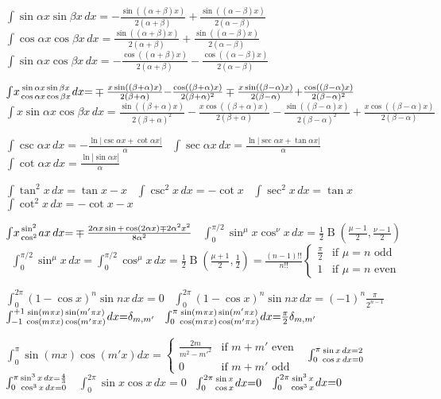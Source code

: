 {$\int\!\sin\alpha x\sin\beta x\,dx{=}{-}\frac{\sin((\alpha{+}\beta)x)}{2(\alpha{+}\beta)}{+}\frac{\sin((\alpha{-}\beta)x)}{2(\alpha{-}\beta)}$ \
$\int\!\cos\alpha x\cos\beta x\,dx{=}\frac{\sin((\alpha{+}\beta)x)}{2(\alpha{+}\beta)}{+}\frac{\sin((\alpha{-}\beta)x)}{2(\alpha{-}\beta)}$ \
$\int\!\sin\alpha x\cos\beta x\,dx{=}{-}\frac{\cos((\alpha{+}\beta)x)}{2(\alpha{+}\beta)}{-}\frac{\cos((\alpha{-}\beta)x)}{2(\alpha{-}\beta)}$

$\int\!x\genfrac{}{}{0pt}{}{\sin\alpha x\sin\beta x}{\cos\alpha x\cos\beta x}dx{=}\mp\frac{x\sin((\beta{+}\alpha)x)}{2(\beta{+}\alpha)}{-}\frac{\cos((\beta{+}\alpha)x)}{2(\beta{+}\alpha)^2}\mp\frac{x\sin((\beta{-}\alpha)x)}{2(\beta{-}\alpha)}{+}\frac{\cos((\beta{-}\alpha)x)}{2(\beta{-}\alpha)^2}$ \
$\int\!x\sin\alpha x\cos\beta x\,dx{=}\frac{\sin((\beta{+}\alpha)x)}{2(\beta{+}\alpha)^2}{-}\frac{x\cos((\beta{+}\alpha)x)}{2(\beta{+}\alpha)}{-}\frac{\sin((\beta{-}\alpha)x)}{2(\beta{-}\alpha)^2}{+}\frac{x\cos((\beta{-}\alpha)x)}{2(\beta{-}\alpha)}$

$\int\!\csc\alpha x\,dx{=}{-}\frac{\ln|\csc\alpha x{+}\cot\alpha x|}{\alpha}$ \
$\int\!\sec\alpha x\,dx{=}\frac{\ln|\sec\alpha x{+}\tan\alpha x|}{\alpha}$ \
$\int\!\cot\alpha x\,dx{=}\frac{\ln|\sin\alpha x|}{\alpha}$

$\int\!\tan^2x\,dx{=}\tan x{-}x$ \
$\int\!\csc^2x\,dx{=}{-}\cot x$ \
$\int\!\sec^2x\,dx{=}\tan x$ \
$\int\!\cot^2x\,dx{=}{-}\cot x{-}x$

$\int\!x\genfrac{}{}{0pt}{}{\sin^2}{\cos^2}ax\,dx{=}\mp\frac{2\alpha x\sin{+}\cos(2\alpha x)\mp2\alpha^2x^2}{8\alpha^2}$ \
$\int_0^{\pi/2}\!\sin^\mu x\cos^\nu x\,dx{=}\frac{1}{2}\operatorname{B}(\frac{\mu-1}{2},\frac{\nu-1}{2})$ \
$\int_0^{\pi/2}\!\sin^\mu x\,dx{=}\int_0^{\pi/2}\!\cos^\mu x\,dx{=}\frac{1}{2}\operatorname{B}(\frac{\mu+1}{2},\frac{1}{2}){=}\frac{(n-1)!!}{n!!}\begin{cases}\frac{\pi}{2}&\text{if }\mu{=}n\text{ odd}\\1&\text{if }\mu{=}n\text{ even}\end{cases}$

$\int_0^{2\pi}\!(1{-}\cos x)^n\sin nx\,dx{=}0$ \
$\int_0^{2\pi}\!(1{-}\cos x)^n\sin nx\,dx{=}(-1)^n\frac{\pi}{2^{n-1}}$ \
$\int_{-1}^{+1}\!\genfrac{}{}{0pt}{}{\sin(m\pi x)\sin(m'\pi x)}{\cos(m\pi x)\cos(m'\pi x)}dx{=}\delta_{m,m'}$ \
$\int_0^\pi\!\genfrac{}{}{0pt}{}{\sin(m\pi x)\sin(m'\pi x)}{\cos(m\pi x)\cos(m'\pi x)}dx{=}\frac{\pi}{2}\delta_{m,m'}$

$\int_0^\pi\!\sin(mx)\cos(m'x)dx{=}\begin{cases}\frac{2m}{m^2-m'^2}&\text{if }m{+}m'\text{ even}\\0&\text{if }m{+}m'\text{ odd}\end{cases}$ \
$\int_0^\pi\!\genfrac{}{}{0pt}{}{\sin x\,dx{=}2}{\cos x\,dx{=}0}$ \
$\int_0^\pi\!\genfrac{}{}{0pt}{}{\sin^3x\,dx{=}\frac{4}{3}}{\cos^3x\,dx{=}0}$ \
$\int_0^{2\pi}\!\sin x\cos x\,dx{=}0$ \
$\int_0^{2\pi}\!\genfrac{}{}{0pt}{}{\sin x}{\cos x}dx{=}0$ \
$\int_0^{2\pi}\!\genfrac{}{}{0pt}{}{\sin^3x}{\cos^3x}dx{=}0$

}
